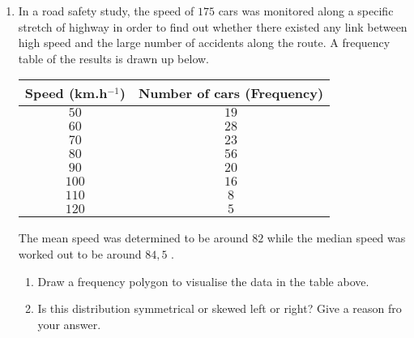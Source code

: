 {\begin{enumerate}
\item In a road safety study, the speed of $175$ cars was monitored along a specific stretch of highway in order to find out whether there existed any link between high speed and the large number of accidents along the route. A frequency table of the results is drawn up below.
\begin{center}
\begin{tabular}{|c|c|}\hline
\textbf{Speed (km.h$^{-1}$)} & \textbf{Number of cars (Frequency)} \\\hline
 $50$ & $19$ \\\hline
 $60$ & $28$ \\\hline
 $70$ & $23$ \\\hline
 $80$ & $56$ \\\hline
 $90$ & $20$ \\\hline
 $100$ & $16$ \\\hline
 $110$ & $8$ \\\hline
 $120$ & $5$ \\\hline
\end{tabular}
\end{center}
The mean speed was determined to be around $82$ \kph while the median speed was worked out to be around $84,5$ \kph.
\begin{enumerate}
\item Draw a frequency polygon to visualise the data in the table above.
\item Is this distribution symmetrical or skewed left or right? Give a reason fro your answer.
\end{enumerate}

\end{enumerate}

\practiceinfo}

